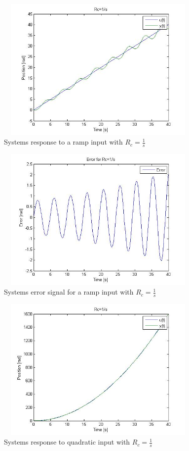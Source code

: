 \documentclass[letterpaper, 11pt, openany]{book}
\begin{document}
\begin{enumerate}
\begin{enumerate}
\begin{figure}[htbp]%
\centering
\includegraphics[width=0.9\textwidth, height = 7cm]{graphics/Ramp2.jpg} 
\caption{Systems response to a ramp input with $R_c = \frac{1}{s}$}\label{fig:Ramp2}
\end{figure}

\begin{figure}[htbp]%
\centering
\includegraphics[width=0.9\textwidth, height = 7cm]{graphics/Ramp2Err.jpg} 
\caption{Systems error signal for a ramp input with $R_c = \frac{1}{s}$}\label{fig:Ramp2Err}
\end{figure}

\begin{figure}[htbp]%
\centering
\includegraphics[width=0.9\textwidth, height = 7cm]{graphics/Quad2.jpg} 
\caption{Systems response to quadratic input with $R_c = \frac{1}{s}$}\label{fig:Quad2}
\end{figure}


\end{enumerate}
\end{enumerate}
\end{document}
